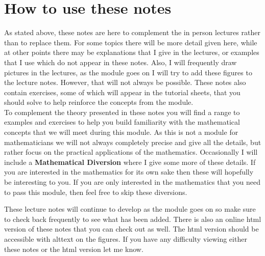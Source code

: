 \section*{How to use these notes }
As stated above, these notes are here to complement the in person lectures rather than to replace them.  For some topics there will be more detail given here, while at other points there may be explanations that I give in the lectures, or examples that I use which do not appear in these notes.  Also, I will frequently draw pictures in the lectures, as the module goes on I will try to add these figures to the lecture notes. However, that will not always be possible. These notes also contain exercises, some of which will appear in the tutorial sheets, that you should solve to help reinforce the concepts from the module.\\

To complement the theory presented in these notes you will find a range to examples and exercises to help you build familiarity with the mathematical concepts that we will meet during this module. As this is not a module for mathematicians we will not always completely precise and give all the details, but rather focus on the practical applications of the mathematics. Occasionally I will include a \textbf{\gls{Mathematical Diversion}} where I give some more of these details. If you are interested in the mathematics for its own sake then these will hopefully be interesting to you. If you are only interested in the mathematics that you need to pass this module, then feel free to skip these diversions.\\

\begin{warpprint} %
These lecture notes will continue to develop as the module goes on so make sure to check back frequently to see what has been added. There is also an online html version of these notes that you can check out as well. The html version should be accessible with alttext on the figures. If you have any difficulty viewing either these notes or the html version let me know.
\end{warpprint}

